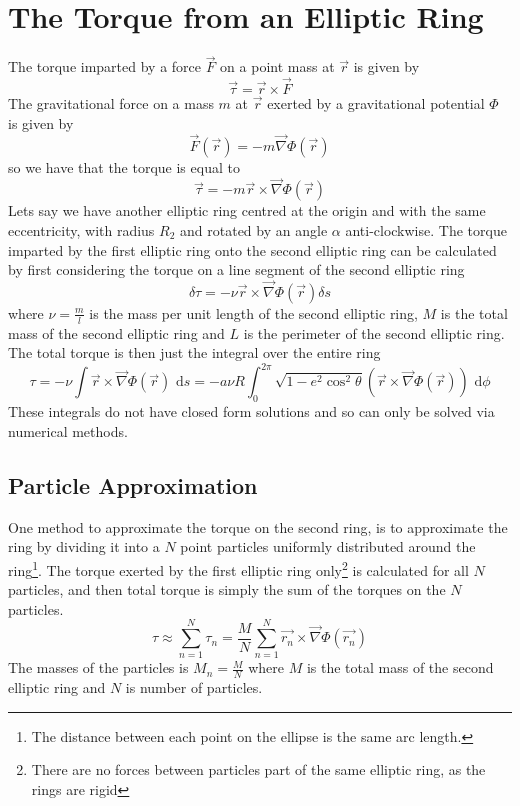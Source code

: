 \section{The Torque from an Elliptic Ring}

The torque imparted by a force \( \vec{F} \) on a point mass at \( \vec{r} \) is given by
\begin{equation}
    \vec{\tau} = \vec{r} \times \vec{F}
\end{equation}
The gravitational force on a mass \( m \) at \( \vec{r} \) exerted by a gravitational potential \( \Phi \) is given by
\begin{equation}
    \vec{F}(\vec{r}) = -m\vec{\nabla} \Phi(\vec{r})
\end{equation}
so we have that the torque is equal to
\begin{equation}
    \vec{\tau} = -m\vec{r} \times \vec{\nabla} \Phi(\vec{r})
\end{equation}
Lets say we have another elliptic ring centred at the origin and with the same eccentricity,
with radius \( R_2 \) and rotated by an angle \( \alpha \) anti-clockwise. The torque
imparted by the first elliptic ring onto the second elliptic ring can be calculated by
first considering the torque on a line segment of the second elliptic ring
\begin{equation}
    \delta \tau = -\nu \vec{r} \times \vec{\nabla} \Phi(\vec{r}) \delta s
\end{equation}
where \( \nu = \frac{m}{l} \) is the mass per unit length of the second elliptic ring, \( M \) is the
total mass of the second elliptic ring and \( L \) is the perimeter of the second elliptic ring. The total
torque is then just the integral over the entire ring
\begin{equation}
    \tau
    = -\nu \int \vec{r} \times \vec{\nabla} \Phi(\vec{r}) \,{}\,{} \mathrm{d}s
    = -a\nu R \int_{0}^{2\pi} \sqrt{1 - e^2\cos^2{\theta}} \left(\vec{r} \times \vec{\nabla} \Phi(\vec{r})\right) \,\,{} \mathrm{d}\phi
\end{equation}
These integrals do not have closed form solutions and so can only be solved via numerical methods.

\subsection{Particle Approximation}
One method to approximate the torque on the second ring, is to approximate the ring by
dividing it into a \( N \) point particles uniformly distributed around the
ring\footnote{The distance between each point on the ellipse is the same arc length.}.
The torque exerted by the first elliptic ring
only\footnote{There are no forces between particles part of the same elliptic ring, as the rings are rigid}
is calculated for all \( N \) particles, and then total torque is simply the sum of the
torques on the \( N \) particles.
\begin{equation}
    \tau \approx \sum_{n=1}^{N} \tau_n = \frac{M}{N} \sum_{n=1}^{N} \vec{r_n} \times \vec{\nabla} \Phi(\vec{r_n})
\end{equation}
The masses of the particles is \( M_n = \frac{M}{N} \) where \( M \) is the total mass of the second elliptic ring and \( N \) is
number of particles.

